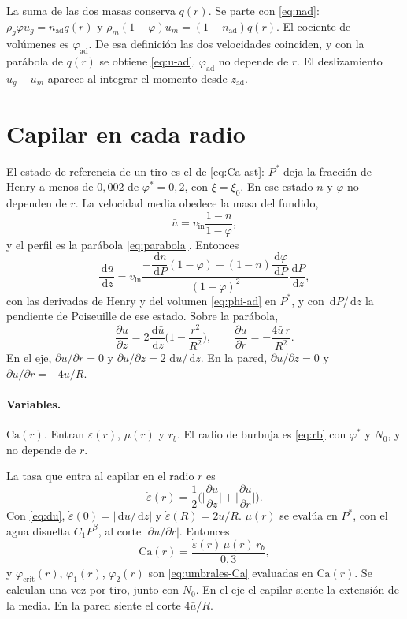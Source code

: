 \documentclass[11pt,a4paper]{article}
\newcommand{\dd}{\,\mathrm{d}}
\newcommand{\p}{\partial}
\newcommand{\vin}{v_{\mathrm{in}}}
\begin{document}
La suma de las dos masas conserva $q(r)$. Se parte con
\eqref{eq:nad}: $\rho_g\varphi u_g=n_{\mathrm{ad}}q(r)$ y
$\rho_m(1-\varphi)u_m=(1-n_{\mathrm{ad}})q(r)$. El cociente de
volúmenes es $\varphi_{\mathrm{ad}}$. De esa definición las dos
velocidades coinciden, y con la parábola de $q(r)$ se obtiene
\eqref{eq:u-ad}. $\varphi_{\mathrm{ad}}$ no depende de $r$. El
deslizamiento $u_g-u_m$ aparece al integrar el momento desde
$z_{\mathrm{ad}}$.

\section{Capilar en cada radio}

El estado de referencia de un tiro es el de
\eqref{eq:Ca-ast}: $P^\ast$ deja la fracción de Henry a menos de
$0{,}002$ de $\varphi^\ast=0{,}2$, con $\xi=\xi_0$. En ese estado
$n$ y $\varphi$ no dependen de $r$. La velocidad media obedece la
masa del fundido,
\begin{equation}
\label{eq:umed}
\bar u=\vin\frac{1-n}{1-\varphi},
\end{equation}
y el perfil es la parábola \eqref{eq:parabola}. Entonces
\begin{equation}
\label{eq:dudz}
\frac{\dd\bar u}{\dd z}
=\vin
\frac{
-\dfrac{\dd n}{\dd P}(1-\varphi)+(1-n)\dfrac{\dd\varphi}{\dd P}
}{(1-\varphi)^2}
\frac{\dd P}{\dd z},
\end{equation}
con las derivadas de Henry y del volumen \eqref{eq:phi-ad} en
$P^\ast$, y con $\dd P/\dd z$ la pendiente de Poiseuille de ese
estado. Sobre la parábola,
\begin{equation}
\label{eq:du}
\frac{\p u}{\p z}
=2\frac{\dd\bar u}{\dd z}\Biggl(1-\frac{r^2}{R^2}\Biggr),
\qquad
\frac{\p u}{\p r}=-\frac{4\bar u\, r}{R^2}.
\end{equation}
En el eje, $\p u/\p r=0$ y $\p u/\p z=2\,\dd\bar u/\dd z$. En la
pared, $\p u/\p z=0$ y $\p u/\p r=-4\bar u/R$.

\paragraph{Variables.}
$\mathrm{Ca}(r)$. Entran $\dot\varepsilon(r)$, $\mu(r)$ y $r_b$.
El radio de burbuja es \eqref{eq:rb} con $\varphi^\ast$ y $N_0$, y
no depende de $r$.

La tasa que entra al capilar en el radio $r$ es
\begin{equation}
\label{eq:eps}
\dot\varepsilon(r)
=\frac12\Biggl(
\biggl|\frac{\p u}{\p z}\biggr|
+\biggl|\frac{\p u}{\p r}\biggr|
\Biggr).
\end{equation}
Con \eqref{eq:du}, $\dot\varepsilon(0)=|\dd\bar u/\dd z|$ y
$\dot\varepsilon(R)=2\bar u/R$. $\mu(r)$ se evalúa en $P^\ast$, con
el agua disuelta $C_1 P^{\beta}$, al corte $|\p u/\p r|$. Entonces
\begin{equation}
\label{eq:Ca-r}
\mathrm{Ca}(r)=\frac{\dot\varepsilon(r)\,\mu(r)\,r_b}{0{,}3},
\end{equation}
y $\varphi_{\mathrm{crit}}(r)$, $\varphi_1(r)$, $\varphi_2(r)$ son
\eqref{eq:umbrales-Ca} evaluadas en $\mathrm{Ca}(r)$. Se calculan
una vez por tiro, junto con $N_0$. En el eje el capilar siente la
extensión de la media. En la pared siente el corte $4\bar u/R$.
\end{document}
